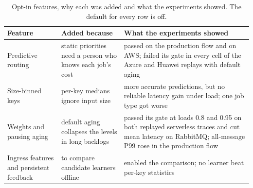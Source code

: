 \begin{table}[t]
\centering
\caption{Opt-in features, why each was added and what the experiments showed. The default for every row is off.}
\label{tab:optin}
\begin{tabularx}{\textwidth}{>{\raggedright\arraybackslash}p{3.1cm}>{\raggedright\arraybackslash}p{4.0cm}L}
\toprule
{} \textbf{Feature} & \textbf{Added because} & \textbf{What the experiments showed} \\
\midrule
Predictive routing & static priorities need a person who knows each job's cost & passed on the production flow and on AWS; failed its gate in every cell of the Azure and Huawei replays with default aging \\
Size-binned keys & per-key medians ignore input size & more accurate predictions, but no reliable latency gain under load; one job type got worse \\
Weights and pausing aging & default aging collapses the levels in long backlogs & passed its gate at loads 0.8 and 0.95 on both replayed serverless traces and cut mean latency on RabbitMQ; all-message P99 rose in the production flow \\
Ingress features and persistent feedback & to compare candidate learners offline & enabled the comparison; no learner beat per-key statistics \\
\bottomrule
\end{tabularx}
\end{table}
